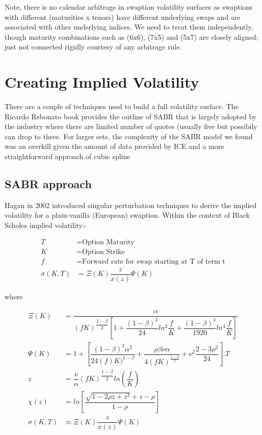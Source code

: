 \documentclass[11pt]{article}
\begin{document}
Note, there is no calendar arbitrage in swaption volatility surfaces as swaptions with different (maturities x tenors) have different underlying swaps and are associated with other underlying indices.  We need to treat them independently, though maturity combinations such as (6x6), (7x5) and (5x7) are closely aligned; just not connected rigidly courtesy of any arbitrage rule. \par


\section{Creating Implied Volatility}

There are a couple of techniques used to build a full volatility surface.  The Ricardo Rebonato book\cite{book_rebonato_2009} provides the outline of SABR that is largely adopted by the industry where there are limited number of quotes (usually five but possibily can drop to three.  For larger sets, the complexity of the SABR model we found was an overkill given the amount of data provided by ICE and a more straightforward approach of cubic spline  \par

\subsection{SABR approach}

Hagan in 2002\cite{art_hagan_2002} introduced singular perturbation techniques to derive the implied volatility for a plain-vanilla (European) swaption.  Within the context of Black Scholes implied volatility:- \par

\begin{align}
	T &= \text{Option Maturity} \\
	K &= \text{Option Strike} \\
	f &= \text{Forward rate for swap starting at T of term t} \\
	\sigma(K, T) &= \Xi(K) \dfrac{z}{x(z)} \Psi(K)	
\end{align}

where \par
\begin{align}
	\Xi(K)  &= \dfrac{\alpha}{\left(f K\right)^{\dfrac{1-\beta}{2}} \left[ 1 + \dfrac{(1-\beta)^2}{24} ln^2 \dfrac{f}{K} + \dfrac{(1-\beta)^4}{1920} ln^4\dfrac{f}{K}\right] }\\
	\Psi(K) &= 1 + \left[ \dfrac{(1-\beta)^2\alpha^2}{24(f)K)^{1-\beta}} + \dfrac{\rho\beta\nu\alpha}{4 (f K)^{\frac{1-\beta}{2}}} + \nu^2 \dfrac{2-3\rho^2}{24} \right].T\\
	z       &= \dfrac{\nu}{\alpha} \left(f K\right)^{\dfrac{1-\beta}{2}} ln\left(\dfrac{f}{K} \right)\\
	\chi(z)    &= ln \left[ \dfrac{\sqrt{1-2\rho z + z^2} + z-\rho}{1-\rho} \right] \\
		\sigma(K, T) &\approx \Xi(K) \dfrac{z}{x(z)} \Psi(K)	
\end{align}
\end{document}
